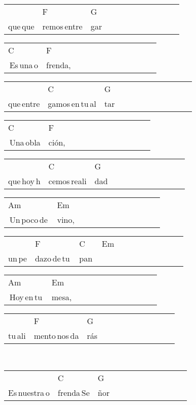 \begin{multicols}{2}
\begin{minipage}{\columnwidth}
\noindent
\begin{tabular}{llllllllllll}
&F&G\\
que\,que&remos\,entre&gar
\end{tabular}

\noindent
\begin{tabular}{llllllllllll}
C&F\\
\,Es\,una\,o&frenda,
\end{tabular}

\noindent
\begin{tabular}{llllllllllll}
&C&G\\
que\,entre&gamos\,en\,tu\,al&tar
\end{tabular}

\noindent
\begin{tabular}{llllllllllll}
C&F\\
\,Una\,obla&ción,
\end{tabular}

\noindent
\begin{tabular}{llllllllllll}
&C&G\\
que\,hoy\,h&cemos\,reali&dad
\end{tabular}

\noindent
\begin{tabular}{llllllllllll}
Am&Em\\
\,Un\,poco\,de\,&vino,
\end{tabular}

\noindent
\begin{tabular}{llllllllllll}
&F&C&Em\\
un\,pe&dazo\,de\,tu\,&pan\,&
\end{tabular}

\noindent
\begin{tabular}{llllllllllll}
Am&Em\\
\,Hoy\,en\,tu\,&mesa,
\end{tabular}

\noindent
\begin{tabular}{llllllllllll}
&F&G\\
tu\,ali&mento\,nos\,da&rás
\end{tabular}
\end{minipage}\\

\noindent
\begin{minipage}{\columnwidth}
\noindent
\noindent
\begin{tabular}{llllllllllll}
&C&G\\
Es\,nuestra\,o&frenda\,Se&ñor
\end{tabular}


\end{minipage}
\end{multicols}

